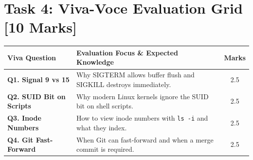 \section*{Task 4: Viva-Voce Evaluation Grid [10 Marks]}
\begin{table}[htbp]
\centering
\small
\begin{tabularx}{\linewidth}{l X c}
\toprule
\textbf{Viva Question} & \textbf{Evaluation Focus \& Expected Knowledge} & \textbf{Marks} \\
\midrule
\textbf{Q1. Signal 9 vs 15} & Why SIGTERM allows buffer flush and SIGKILL destroys immediately. & 2.5 \\
\textbf{Q2. SUID Bit on Scripts} & Why modern Linux kernels ignore the SUID bit on shell scripts. & 2.5 \\
\textbf{Q3. Inode Numbers} & How to view inode numbers with \texttt{ls -i} and what they index. & 2.5 \\
\textbf{Q4. Git Fast-Forward} & When Git can fast-forward and when a merge commit is required. & 2.5 \\
\bottomrule
\end{tabularx}
\end{table}
